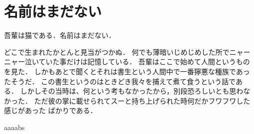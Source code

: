 \section{名前はまだない}
吾輩は猫である．名前はまだない．

どこで生まれたかとんと見当がつかぬ．
何でも薄暗いじめじめした所でニャーニャー泣いていた事だけは記憶している．
吾輩はここで始めて人間というものを見た．
しかもあとで聞くとそれは書生という人間中で一番獰悪な種族であったそうだ．
この書生というのはときどき我々を捕えて煮て食うという話である．
しかしその当時は、何という考もなかったから，別段恐ろしいとも思わなかった．
ただ彼の掌に載せられてスーと持ち上げられた時何だかフワフワした感じがあった
ばかりである．

aaaabs